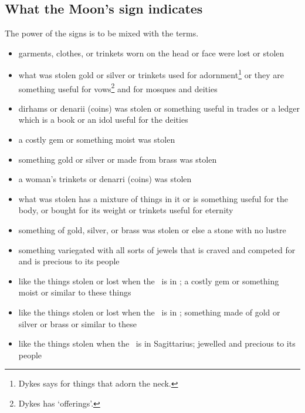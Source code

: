 \subsection{What the Moon's sign indicates}
The power of the signs is to be mixed with the terms. 
\begin{itemize}[topsep=0em,itemsep=0em]
\item[\Aries] garments, clothes, or trinkets worn on the head or face were lost or stolen
\item[\Taurus] what was stolen gold or silver or trinkets used for adornment\footnote{Dykes says for things that adorn the neck.} or they are something useful for vows\footnote{Dykes has `offerings'.} and for mosques and deities
\item[\Gemini] dirhams or denarii (coins) was stolen or something useful in trades or a ledger which is a book or an idol useful for the deities
\item[\Cancer] a costly gem or something moist was stolen
\item[\Leo] something gold or silver or made from brass was stolen
\item[\Virgo] a woman's trinkets or denarri (coins) was stolen
\item[\Libra] what was stolen has a mixture of things in it or is something useful for the body, or bought for its weight or trinkets useful for eternity
\item[\Scorpio] something of gold, silver, or brass was stolen or else a stone with no lustre
\item[\Sagittarius] something variegated with all sorts of jewels that is craved and competed for and is precious to its people
\item[\Capricorn] like the things stolen or lost when the \Moon\, is in \Cancer; a costly gem or something moist or similar to these things
\item[\Aquarius] like the things stolen or lost when the \Moon\, is in \Leo; something made of gold or silver or brass or similar to these
\item[\Pisces] like the things stolen when the \Moon\, is in Sagittarius; jewelled and precious to its people
\end{itemize}


